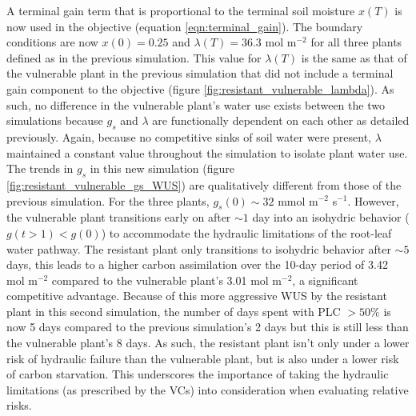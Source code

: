 \documentclass[utf8]{frontiersSCNS} %
\begin{document}
A terminal gain term that is proportional to the terminal soil moisture $x(T)$ is now used in the objective (equation \ref{eqn:terminal_gain}). The boundary conditions are now $x(0)=0.25$ and $\lambda(T)=36.3$ mol m$^{-2}$ for all three plants defined as in the previous simulation. This value for $\lambda(T)$ is the same as that of the vulnerable plant in the previous simulation that did not include a terminal gain component to the objective (figure \ref{fig:resistant_vulnerable_lambda}). As such, no difference in the vulnerable plant's water use exists between the two simulations because $g_s$ and $\lambda$ are functionally dependent on each other as detailed previously. Again, because no competitive sinks of soil water were present, $\lambda$ maintained a constant value throughout the simulation to isolate plant water use. The trends in $g_s$ in this new simulation (figure \ref{fig:resistant_vulnerable_gs_WUS}) are qualitatively different from those of the previous simulation. For the three plants, $g_s(0) \sim 32$ mmol m$^{-2}$ s$^{-1}$. However, the vulnerable plant transitions early on after $\sim 1$ day into an isohydric behavior ($g(t>1)<g(0)$) to accommodate the hydraulic limitations of the root-leaf water pathway. The resistant plant only transitions to isohydric behavior after $\sim 5$ days, this leads to a higher carbon assimilation over the 10-day period of 3.42 mol m$^{-2}$ compared to the vulnerable plant's 3.01 mol m$^{-2}$, a significant competitive advantage. Because of this more aggressive WUS by the resistant plant in this second simulation, the number of days spent with PLC $>50\%$ is now 5 days compared to the previous simulation's 2 days but this is still less than the vulnerable plant's 8 days. As such, the resistant plant isn't only under a lower risk of hydraulic failure than the vulnerable plant, but is also under a lower risk of carbon starvation. This underscores the importance of taking the hydraulic limitations (as prescribed by the VCs) into consideration when evaluating relative risks.
\end{document}
